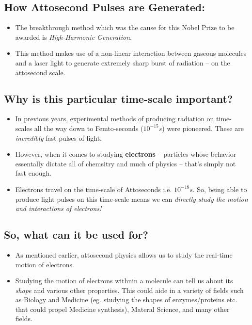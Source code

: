 \documentclass[twoside]{article}
\begin{document}
\subsection*{How Attosecond Pulses are Generated:}
\begin{itemize}
   \item The breakthrough method which was the cause for this Nobel Prize to be awarded is \emph{High-Harmonic Generation}.

   \item This method makes use of a non-linear interaction between gaseous molecules and a laser light to generate extremely sharp burst of radiation -- on the attosecond scale.
\end{itemize}

\subsection*{Why is this particular time-scale important?}
\begin{itemize}
   \item In previous years, experimental methods of producing radiation on time-scales all the way down to Femto-seconds ($10^{-15}s$) were pioneered. These are \emph{incredibly} fast pulses of light.
   \item However, when it comes to studying \textbf{electrons} -- particles whose behavior essentally dictate all of chemsitry and much of physics -- that's simply not fast enough.
   \item Electrons travel on the time-scale of Attoseconds i.e. $10^{-18}s$. So, being able to produce light pulses on this time-scale means we can 
   \emph{directly study the motion and interactions of electrons!}
\end{itemize}


\subsection*{So, what can it be used for?}
\begin{itemize}
   \item As mentioned earlier, attosecond physics allows us to study the real-time motion of electrons.
   \item Studying the motion of electrons withnin a molecule can tell us about its \emph{shape} and various other properties. This could aide in a variety of fields such as Biology and Medicine (eg. studying the shapes of enzymes/proteins etc. that could propel Medicine synthesis), Materal Science, and many other fields.
\end{itemize}
\end{document}
